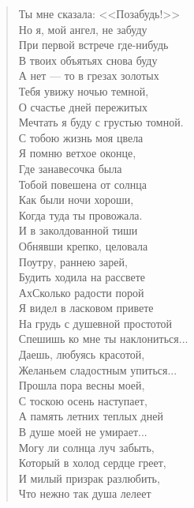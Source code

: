 \begin{verse}
\begin{altverse}
    Ты мне сказала: <<Позабудь!>>\\
Но я, мой ангел, не забуду\ldotst\\
     При первой встрече где-нибудь\\
В твоих объятьях снова буду\ldotst\\
	  А нет --- то в грезах золотых\\
Тебя увижу ночью темной,\\
      О счастье дней пережитых\\
Мечтать я буду с грустью томной.\\
     С тобою жизнь моя цвела\ldotst\\
Я помню ветхое оконце,\\
     Где занавесочка была\\
Тобой повешена от солнца\ldotst\\
     Как были ночи хороши,\\
Когда туда ты провожала.\\
     И в заколдованной тиши\\
Обнявши крепко, целовала\ldotse\\
     Поутру, раннею зарей,\\
Будить ходила на рассвете\ldotst\\
     Ах\ldotst Сколько радости порой\\
Я видел в ласковом привете\ldotse\\
На грудь с душевной простотой\\
Спешишь ко мне ты наклониться...\\
Даешь, любуясь красотой,\\
Желаньем сладостным упиться...\\
Прошла пора весны моей,\\
С тоскою осень наступает,\\
А память летних теплых дней\\
В душе моей не умирает...\\
Могу ли солнца луч забыть,\\
Который в холод сердце греет,\\
И милый призрак разлюбить,\\
Что нежно так душа лелеет\ldotsq
\end{altverse}
\end{verse}

